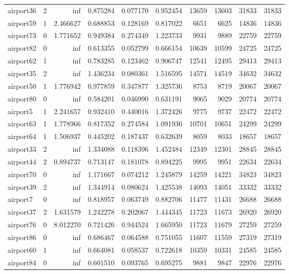 \begin{longtable}{|l|r|r|r|r|r|r|r|r|r|}
airport36 & 2 & inf & 0.875284 & 0.077170 & 0.952454 & 13659 & 13603 & 31833 & 31833 \\
airport59 & 1 & 2.466627 & 0.688853 & 0.128169 & 0.817022 & 6651 & 6625 & 14836 & 14836 \\
airport73 & 0 & 1.771652 & 0.949384 & 0.274349 & 1.223733 & 9931 & 9889 & 22759 & 22759 \\
airport82 & 0 & inf & 0.613355 & 0.052799 & 0.666154 & 10639 & 10599 & 24725 & 24725 \\
airport62 & 1 & inf & 0.783285 & 0.123462 & 0.906747 & 12541 & 12495 & 29413 & 29413 \\
airport35 & 2 & inf & 1.436234 & 0.080361 & 1.516595 & 14571 & 14519 & 34632 & 34632 \\
airport50 & 1 & 1.776942 & 0.977859 & 0.347877 & 1.325736 & 8753 & 8719 & 20067 & 20067 \\
airport80 & 0 & inf & 0.584201 & 0.046990 & 0.631191 & 9065 & 9029 & 20774 & 20774 \\
airport5 & 1 & 2.241657 & 0.932410 & 0.440016 & 1.372426 & 9775 & 9737 & 22472 & 22472 \\
airport63 & 1 & 1.778966 & 0.817352 & 0.274584 & 1.091936 & 10701 & 10651 & 24299 & 24299 \\
airport64 & 1 & 1.506937 & 0.445202 & 0.187437 & 0.632639 & 8059 & 8033 & 18657 & 18657 \\
airport33 & 2 & inf & 1.334088 & 0.118396 & 1.452484 & 12349 & 12301 & 28845 & 28845 \\
airport44 & 2 & 0.894737 & 0.713147 & 0.181078 & 0.894225 & 9995 & 9951 & 22634 & 22634 \\
airport70 & 0 & inf & 1.171667 & 0.074212 & 1.245879 & 14259 & 14221 & 34823 & 34823 \\
airport39 & 2 & inf & 1.344914 & 0.080624 & 1.425538 & 14093 & 14051 & 33332 & 33332 \\
airport7 & 0 & inf & 0.818957 & 0.063749 & 0.882706 & 11477 & 11431 & 26688 & 26688 \\
airport37 & 2 & 1.631579 & 1.242278 & 0.202067 & 1.444345 & 11723 & 11673 & 26920 & 26920 \\
airport76 & 0 & 8.012270 & 0.721426 & 0.944524 & 1.665950 & 11723 & 11679 & 27259 & 27259 \\
airport86 & 0 & inf & 0.686467 & 0.064588 & 0.751055 & 11607 & 11559 & 27319 & 27319 \\
airport60 & 1 & inf & 0.664081 & 0.058537 & 0.722618 & 10359 & 10331 & 24585 & 24585 \\
airport84 & 0 & inf & 0.601510 & 0.093765 & 0.695275 & 9881 & 9847 & 22976 & 22976 \\

\end{longtable}
